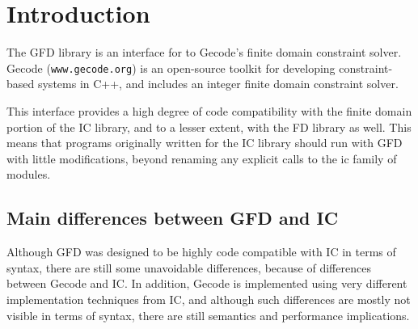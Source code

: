 %
% 
% 
% 
% 


\section{Introduction}

   The GFD library is an interface for \eclipse to Gecode's finite domain constraint
   solver. Gecode ({\tt www.gecode.org}) is an open-source toolkit for 
   developing
   constraint-based systems in C++, and includes an  integer 
   finite domain constraint solver.

   This interface provides a high degree of code compatibility with the finite 
   domain portion of the IC library, and to a lesser extent, with the FD
   library as well. This means that programs originally written for the
   IC library should run with GFD with little modifications, beyond 
   renaming any explicit calls to the ic family of modules.

\subsection{Main differences between GFD and IC}

Although GFD was designed to be highly code compatible with IC in terms of
syntax, there are still some unavoidable differences, because of differences 
between Gecode and IC. In addition, Gecode is 
implemented using very different implementation techniques from IC, and 
although such differences are mostly not visible in terms of syntax, there
are still semantics and performance implications. 

